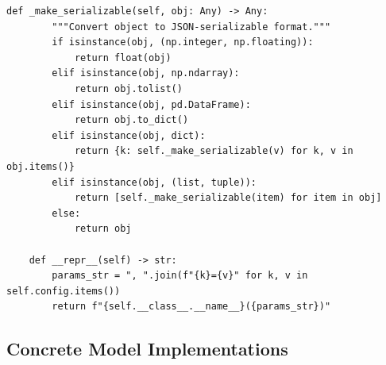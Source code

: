 \begin{lstlisting}[style=python, caption=Abstract base class for ML models]
    def _make_serializable(self, obj: Any) -> Any:
        """Convert object to JSON-serializable format."""
        if isinstance(obj, (np.integer, np.floating)):
            return float(obj)
        elif isinstance(obj, np.ndarray):
            return obj.tolist()
        elif isinstance(obj, pd.DataFrame):
            return obj.to_dict()
        elif isinstance(obj, dict):
            return {k: self._make_serializable(v) for k, v in obj.items()}
        elif isinstance(obj, (list, tuple)):
            return [self._make_serializable(item) for item in obj]
        else:
            return obj

    def __repr__(self) -> str:
        params_str = ", ".join(f"{k}={v}" for k, v in self.config.items())
        return f"{self.__class__.__name__}({params_str})"
\end{lstlisting}

\subsection{Concrete Model Implementations}


